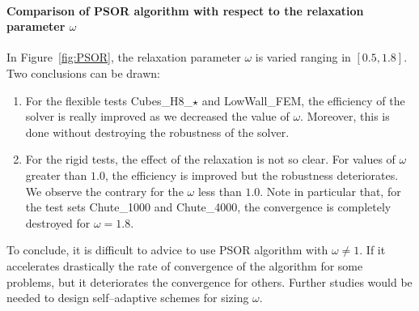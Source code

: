 \paragraph{Comparison of {\sf PSOR}  algorithm with respect to  the relaxation parameter $\omega$}

In Figure~\ref{fig:PSOR},  the relaxation parameter $\omega$ is varied ranging in $[0.5,1.8]$.  Two conclusions can be drawn:
\begin{enumerate}
\item For the flexible tests Cubes\_H8\_$\star$ and  LowWall\_FEM, the efficiency of the solver is really improved as we decreased the value of $\omega$. Moreover, this is done without destroying the robustness of the solver.
\item For the rigid tests, the effect of the relaxation is not so clear. For values of $\omega$ greater than $1.0$, the efficiency is improved but the robustness deteriorates. We observe the contrary for the  $\omega$  less than $1.0$. Note in particular that, for the test sets Chute\_1000 and Chute\_4000, the convergence is completely destroyed for $\omega = 1.8$.
\end{enumerate}
To conclude, it is difficult to advice to use PSOR algorithm with $\omega\neq 1$. If it accelerates drastically the rate of convergence of the algorithm for some problems, but it deteriorates the convergence for others. Further studies would be needed to design self--adaptive schemes for sizing $\omega$.

